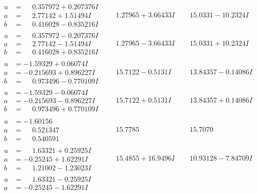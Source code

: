 \documentclass[1p]{elsarticle_modified}
\theoremstyle{definition}
\begin{document}
$$\begin{array}{c|c|c}
\begin{aligned}
u &= \phantom{-}0.357972 + 0.207376 I \\
a &= \phantom{-}2.77142 + 1.51494 I \\
b &= \phantom{-}0.416028 - 0.835216 I\end{aligned}
 & \phantom{-}1.27965 + 3.66433 I & \phantom{-}15.0331 - 10.2324 I \\ \hline\begin{aligned}
u &= \phantom{-}0.357972 - 0.207376 I \\
a &= \phantom{-}2.77142 - 1.51494 I \\
b &= \phantom{-}0.416028 + 0.835216 I\end{aligned}
 & \phantom{-}1.27965 - 3.66433 I & \phantom{-}15.0331 + 10.2324 I \\ \hline\begin{aligned}
u &= -1.59329 + 0.06074 I \\
a &= -0.215693 + 0.896227 I \\
b &= \phantom{-}0.973496 - 0.770109 I\end{aligned}
 & \phantom{-}15.7122 - 0.5131 I & \phantom{-}13.84357 - 0.14086 I \\ \hline\begin{aligned}
u &= -1.59329 - 0.06074 I \\
a &= -0.215693 - 0.896227 I \\
b &= \phantom{-}0.973496 + 0.770109 I\end{aligned}
 & \phantom{-}15.7122 + 0.5131 I & \phantom{-}13.84357 + 0.14086 I \\ \hline\begin{aligned}
u &= -1.60156\phantom{ +0.000000I} \\
a &= \phantom{-}0.521347\phantom{ +0.000000I} \\
b &= \phantom{-}0.540591\phantom{ +0.000000I}\end{aligned}
 & \phantom{-}15.7785\phantom{ +0.000000I} & \phantom{-}15.7070\phantom{ +0.000000I} \\ \hline\begin{aligned}
u &= \phantom{-}1.63321 + 0.25925 I \\
a &= -0.25245 + 1.62291 I \\
b &= \phantom{-}1.21002 - 1.23023 I\end{aligned}
 & \phantom{-}15.4855 + 16.9496 I & \phantom{-}10.93128 - 7.84709 I \\ \hline\begin{aligned}
u &= \phantom{-}1.63321 - 0.25925 I \\
a &= -0.25245 - 1.62291 I \\

\end{aligned}
\end{array}$$
\end{document}

